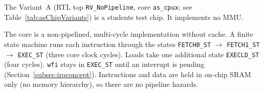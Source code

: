 The \aschip \; Variant~A (RTL top \texttt{RV\_NoPipeline}, core \texttt{as\_cpux};
see Table~\ref{tab:asChipVariants}) is a students test chip. It implements no MMU.

The core is a non-pipelined, multi-cycle implementation without cache.
A finite state machine runs each instruction through the states
\texttt{FETCH0\_ST} $\rightarrow$ \texttt{FETCH1\_ST} $\rightarrow$ \texttt{EXEC\_ST}
(three core clock cycles). Loads take one additional state \texttt{EXECLD\_ST}
(four cycles). \texttt{wfi} stays in \texttt{EXEC\_ST} until an interrupt is
pending (Section~\ref{subsec:irqconcept}).
Instructions and data are held in on-chip SRAM only (no memory hierarchy), so
there are no pipeline hazards.
